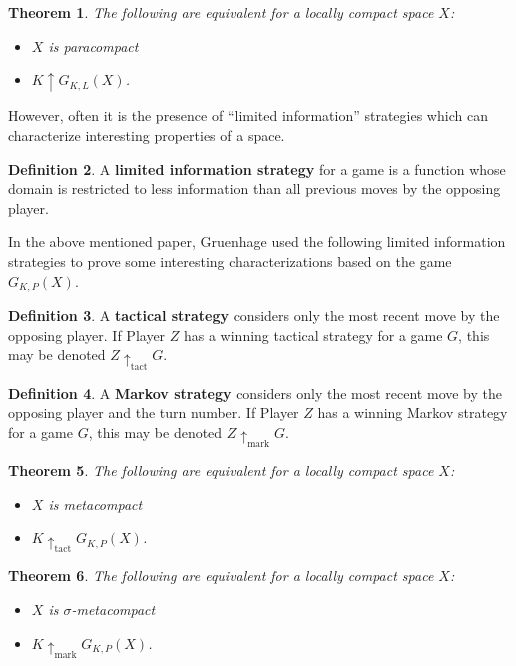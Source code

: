 \documentclass[11pt]{article}
\theoremstyle{plain}
\newtheorem{theorem}{Theorem}
\theoremstyle{definition}
\newtheorem{definition}[theorem]{Definition}
\theoremstyle{remark}
\begin{document}
\begin{theorem}
The following are equivalent for a locally compact space $X$:
    \begin{itemize}
    \item $X$ is paracompact
    \item $K \uparrow G_{K,L}(X)$.
    \end{itemize}
\end{theorem}

However, often it is the presence of ``limited information'' strategies which can characterize interesting properties of a space.

\begin{definition}
A \textbf{limited information strategy} for a game is a function whose domain is restricted to less information than all previous moves by the opposing player.
\end{definition}

In the above mentioned paper, Gruenhage used the following limited information strategies to prove some interesting characterizations based on the game $G_{K,P}(X)$.

\begin{definition}
A \textbf{tactical strategy} considers only the most recent move by the opposing player. If Player $Z$ has a winning tactical strategy for a game $G$, this may be denoted $Z \uparrow_{\text{tact}} G$.
\end{definition}

\begin{definition}
A \textbf{Markov strategy} considers only the most recent move by the opposing player and the turn number. If Player $Z$ has a winning Markov strategy for a game $G$, this may be denoted $Z \uparrow_{\text{mark}} G$.
\end{definition}

\begin{theorem}
The following are equivalent for a locally compact space $X$:
    \begin{itemize}
    \item $X$ is metacompact
    \item $K \uparrow_{\text{tact}}G_{K,P}(X)$.
    \end{itemize}
\end{theorem}

\begin{theorem}
The following are equivalent for a locally compact space $X$:
    \begin{itemize}
    \item $X$ is $\sigma$-metacompact
    \item $K \uparrow_{\text{mark}}G_{K,P}(X)$.
    \end{itemize}
\end{theorem}
\end{document}
